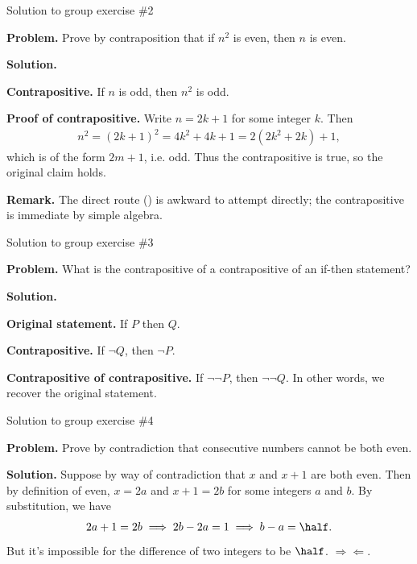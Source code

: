 \documentclass[10pt]{beamer}
\begin{document}
\begin{frame}{Solution to group exercise \#2}


\colorbox{red!30}{\textbf{Problem.}} Prove by contraposition that if $n^2$ is even, then $n$ is even. 

\vfill 
\colorbox{green!30}{\textbf{Solution.}}

\textbf{Contrapositive.} If $n$ is odd, then $n^2$ is odd.
\vfill 
 
\textbf{Proof of contrapositive.} Write $n=2k+1$ for some integer $k$.   Then
%
\begin{align*}
n^2= (2k+1)^2 = 4k^2 + 4k+ 1 = 2(2k^2+2k) + 1,	
\end{align*}
%
which is of the form $2m+1$, i.e. odd.    Thus the contrapositive is true, so the original claim holds.

\vfill 
\pause 

\colorbox{blue!30}{\textbf{Remark.}} The direct route () is awkward to attempt directly; the contrapositive is immediate by simple algebra.
\end{frame}


\begin{frame}{Solution to group exercise \#3}


\colorbox{red!30}{\textbf{Problem.}} What is the contrapositive of a contrapositive of an if-then statement?

\vfill 
\colorbox{green!30}{\textbf{Solution.}}

\textbf{Original statement.} If $P$ then $Q$.

\vfill 
\textbf{Contrapositive.} If $\lnot Q$, then $\lnot P$.
\vfill 
 
\textbf{Contrapositive of contrapositive.} If $\lnot \lnot P$, then $\lnot \lnot Q$. In other words, we recover the original statement.
\vfill 
 
\end{frame}


\begin{frame}{Solution to group exercise \#4}


\colorbox{red!30}{\textbf{Problem.}} Prove by contradiction that consecutive numbers cannot be both even.

\vfill 
\colorbox{green!30}{\textbf{Solution.}} Suppose by way of contradiction that $x$ and $x+1$ are both even.  Then by definition of even, $x=2a$ and $x+1=2b$ for some integers $a$ and $b$.  By substitution, we have
%
\begin{align*}
2a+1=2b \implies 2b-2a=1 \implies b-a = \half. 	
\end{align*}
%
But it's impossible for the difference of two integers to be $\half$. $\Rightarrow\Leftarrow$.

\end{frame}
\end{document}
